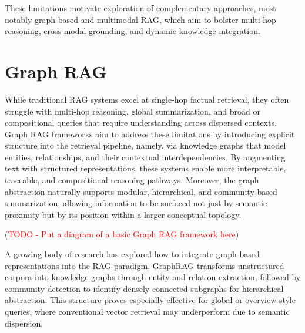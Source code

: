 \documentclass[12pt,twoside]{report}
\begin{document}
These limitations motivate exploration of complementary approaches, most notably graph-based and multimodal RAG, which aim to bolster multi-hop reasoning, cross-modal grounding, and dynamic knowledge integration.

\section{Graph RAG}
While traditional RAG systems excel at single-hop factual retrieval, they often struggle with multi-hop reasoning, global summarization, and broad or compositional queries that require understanding across dispersed contexts. Graph RAG frameworks aim to address these limitations by introducing explicit structure into the retrieval pipeline, namely, via knowledge graphs that model entities, relationships, and their contextual interdependencies. By augmenting text with structured representations, these systems enable more interpretable, traceable, and compositional reasoning pathways. Moreover, the graph abstraction naturally supports modular, hierarchical, and community-based summarization, allowing information to be surfaced not just by semantic proximity but by its position within a larger conceptual topology.

(\textcolor{red}{TODO - Put a diagram of a basic Graph RAG framework here})

A growing body of research has explored how to integrate graph-based representations into the RAG paradigm. GraphRAG \cite{GraphRAG} transforms unstructured corpora into knowledge graphs through entity and relation extraction, followed by community detection to identify densely connected subgraphs for hierarchical abstraction. This structure proves especially effective for global or overview-style queries, where conventional vector retrieval may underperform due to semantic dispersion.
\end{document}
